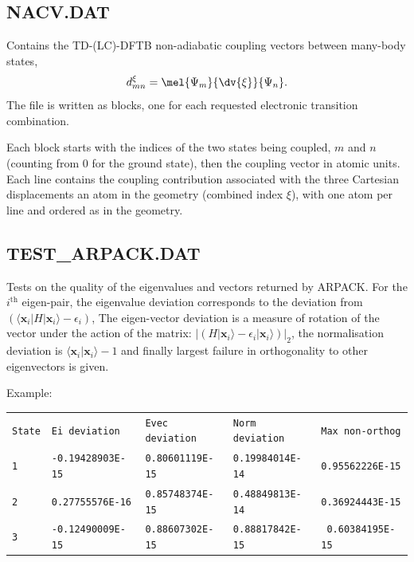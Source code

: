 \subsection{NACV.DAT}
\label{subsec:nacv.dat}

Contains the TD-(LC)-DFTB non-adiabatic coupling vectors between
many-body states, $$d^\xi_{mn} = \mel{\Psi_m}{\dv{\xi}}{\Psi_n}.$$
The file is written as blocks, one for each requested electronic
transition combination.

Each block starts with the indices of the two states being coupled,
$m$ and $n$ (counting from 0 for the ground state), then the coupling
vector in atomic units. Each line contains the coupling contribution
associated with the three Cartesian displacements an atom in the
geometry (combined index $\xi$), with one atom per line and ordered as
in the geometry.

\subsection{TEST\_ARPACK.DAT}

Tests on the quality of the eigenvalues and vectors returned by ARPACK. For the
$i^\mathrm{th}$ eigen-pair, the eigenvalue deviation corresponds to the
deviation from $\left( \langle \mathbf{x}_i | H | \mathbf{x}_i\rangle -
\epsilon_i \right)$, The eigen-vector deviation is a measure of rotation of the
vector under the action of the matrix: $\left| \left( H | \mathbf{x}_i\rangle -
\epsilon_i | \mathbf{x}_i\rangle \right) \right|_2$, the normalisation deviation
is $\langle \mathbf{x}_i | \mathbf{x}_i\rangle - 1$ and finally largest failure
in orthogonality to other eigenvectors is given.

Example:\\
\begin{tabular}{lllll}
{\tt State} & {\tt Ei deviation} & {\tt Evec deviation} & {\tt Norm deviation} &
{\tt Max non-orthog}\\ {\tt 1} & {\tt -0.19428903E-15} & {\tt 0.80601119E-15} &
{\tt 0.19984014E-14} & {\tt 0.95562226E-15}\\ {\tt 2} & {\tt 0.27755576E-16} &
{\tt 0.85748374E-15} & {\tt 0.48849813E-14} & {\tt 0.36924443E-15}\\ {\tt 3} &
{\tt -0.12490009E-15} & {\tt 0.88607302E-15} & {\tt 0.88817842E-15} & {\tt
  0.60384195E-15}\\
\end{tabular}

